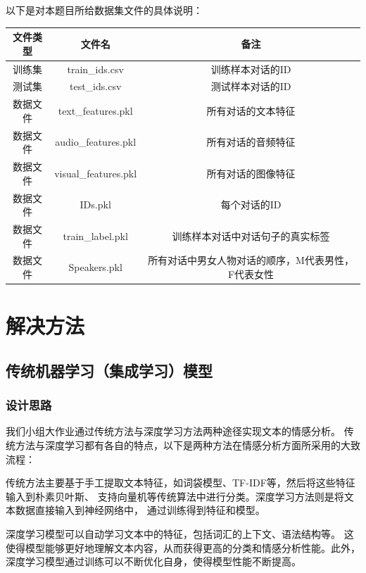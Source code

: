 \documentclass[11pt]{article}
\begin{document}
    以下是对本题目所给数据集文件的具体说明：
    \begin{center}
        \begin{tabular}{|c|c|c|}
            \hline
            \textbf{文件类型} & \textbf{文件名} & \textbf{备注} \\
            \hline
            训练集 & train\_ids.csv & 训练样本对话的ID\\
            \hline
            测试集 & test\_ids.csv & 测试样本对话的ID\\
            \hline
            数据文件 & text\_features.pkl & 所有对话的文本特征\\
            \hline
            数据文件 & audio\_features.pkl & 所有对话的音频特征\\
            \hline
            数据文件 & visual\_features.pkl & 所有对话的图像特征\\
            \hline
            数据文件 & IDs.pkl & 每个对话的ID\\
            \hline
            数据文件 & train\_label.pkl & 训练样本对话中对话句子的真实标签\\
            \hline
            数据文件 & Speakers.pkl & 所有对话中男女人物对话的顺序，M代表男性，F代表女性\\
            \hline
        \end{tabular}     
    \end{center}


    \section{解决方法}
        \subsection{传统机器学习（集成学习）模型}
            \subsubsection{设计思路}
            我们小组大作业通过传统方法与深度学习方法两种途径实现文本的情感分析。
            传统方法与深度学习都有各自的特点，以下是两种方法在情感分析方面所采用的大致流程：
            
            传统方法主要基于手工提取文本特征，如词袋模型、TF-IDF等，然后将这些特征输入到朴素贝叶斯、
            支持向量机等传统算法中进行分类。深度学习方法则是将文本数据直接输入到神经网络中，
            通过训练得到特征和模型。
            
            深度学习模型可以自动学习文本中的特征，包括词汇的上下文、语法结构等。
            这使得模型能够更好地理解文本内容，从而获得更高的分类和情感分析性能。此外，
            深度学习模型通过训练可以不断优化自身，使得模型性能不断提高。
            
\end{document}
